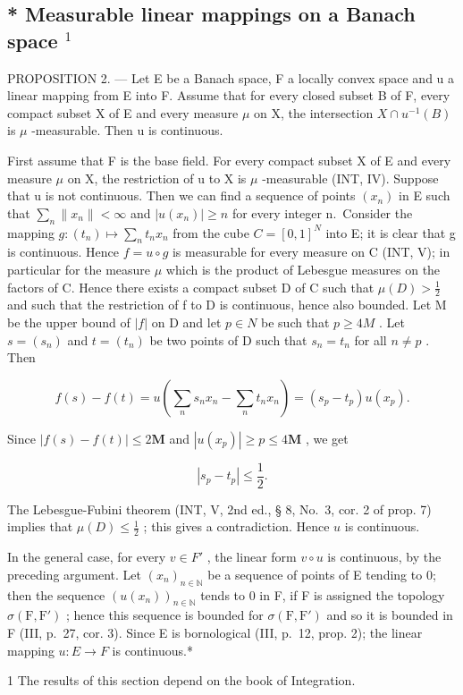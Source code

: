 \subsection{\texorpdfstring{* Measurable linear mappings on a Banach space \(^{1}\)}{Measurable linear mappings on a Banach space \^{}\{1\}}}

PROPOSITION 2. --- Let E be a Banach space, F a locally convex space and u a linear mapping from E into F. Assume that for every closed subset B of F, every compact subset X of E and every measure \(\mu\) on X, the intersection \(X \cap u^{-1}(B)\) is \(\mu\) -measurable. Then u is continuous.

First assume that F is the base field. For every compact subset X of E and every measure \(\mu\) on X, the restriction of u to X is \(\mu\) -measurable (INT, IV). Suppose that u is not continuous. Then we can find a sequence of points \((x_{n})\) in E such that \(\sum_{n} \|x_{n}\| < \infty\) and \(|u(x_{n})| \geqslant n\) for every integer n.~Consider the mapping \(g:(t_{n}) \mapsto \sum_{n} t_{n} x_{n}\) from the cube \(C = [0, 1]^{N}\) into E; it is clear that g is continuous. Hence \(f = u \circ g\) is measurable for every measure on C (INT, V); in particular for the measure \(\mu\) which is the product of Lebesgue measures on the factors of C. Hence there exists a compact subset D of C such that \(\mu(D) > \frac{1}{2}\) and such that the restriction of f to D is continuous, hence also bounded. Let M be the upper bound of \(|f|\) on D and let \(p \in N\) be such that \(p \geqslant 4M\) . Let \(s = (s_{n})\) and \(t = (t_{n})\) be two points of D such that \(s_{n} = t_{n}\) for all \(n \neq p\) . Then

\[
f (s) - f (t) = u (\sum_ {n} s _ {n} x _ {n} - \sum_ {n} t _ {n} x _ {n}) = (s _ {p} - t _ {p}) u (x _ {p}).
\]

Since \(|f(s) - f(t)| \leqslant 2\mathbf{M}\) and \(|u(x_p)| \geqslant p \leqslant 4\mathbf{M}\) , we get

\[
\left| s _ {p} - t _ {p} \right| \leqslant \frac {1}{2}.
\]

The Lebesgue-Fubini theorem (INT, V, 2nd ed., § 8, No.~3, cor. 2 of prop. 7) implies that \(\mu(D) \leqslant \frac{1}{2}\) ; this gives a contradiction. Hence \(u\) is continuous.

In the general case, for every \(v \in F'\) , the linear form \(v \circ u\) is continuous, by the preceding argument. Let \((x_{n})_{n \in \mathbb{N}}\) be a sequence of points of E tending to 0; then the sequence \((u(x_{n}))_{n \in \mathbb{N}}\) tends to 0 in F, if F is assigned the topology \(\sigma(\mathrm{F}, \mathrm{F}')\) ; hence this sequence is bounded for \(\sigma(\mathrm{F}, \mathrm{F}')\) and so it is bounded in F (III, p.~27, cor. 3). Since E is bornological (III, p.~12, prop. 2); the linear mapping \(u: E \to F\) is continuous.*

1 The results of this section depend on the book of Integration.

